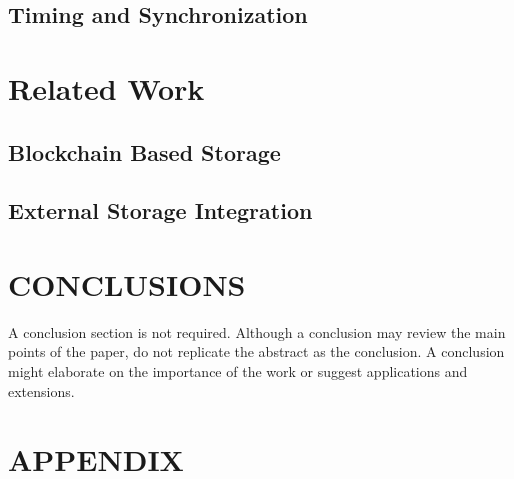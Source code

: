 \documentclass[letterpaper, 10 pt, conference]{ieeeconf}  %
\begin{document}
\subsection{Timing and Synchronization}

\section{Related Work}


\subsection{Blockchain Based Storage}

\subsection{External Storage Integration}

\section{CONCLUSIONS}

A conclusion section is not required. Although a conclusion may review the main points of the paper, do not replicate the abstract as the conclusion. A conclusion might elaborate on the importance of the work or suggest applications and extensions. 

\addtolength{\textheight}{-12cm}   %







\section*{APPENDIX}
\end{document}
